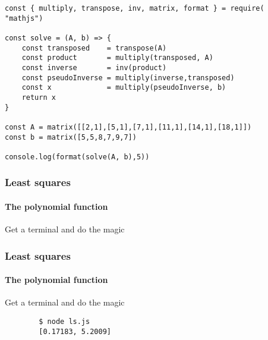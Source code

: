 \documentclass{beamer}
\begin{document}
\begin{frame}[fragile]
	\begin{lstlisting}
const { multiply, transpose, inv, matrix, format } = require( "mathjs")

const solve = (A, b) => {
	const transposed    = transpose(A)
	const product       = multiply(transposed, A)
	const inverse       = inv(product)
	const pseudoInverse = multiply(inverse,transposed)
	const x             = multiply(pseudoInverse, b)
	return x
}

const A = matrix([[2,1],[5,1],[7,1],[11,1],[14,1],[18,1]])
const b = matrix([5,5,8,7,9,7])

console.log(format(solve(A, b),5))
\end{lstlisting}
\end{frame}
\begin{frame}[fragile,t]
	\frametitle{Least squares}
	\framesubtitle{The polynomial function}
	Get a terminal and do the magic
\end{frame}
\begin{frame}[fragile,t]
	\frametitle{Least squares}
	\framesubtitle{The polynomial function}
	Get a terminal and do the magic
	\begin{lstlisting}
		$ node ls.js
		[0.17183, 5.2009]
	\end{lstlisting}
\end{frame}
\end{document}
